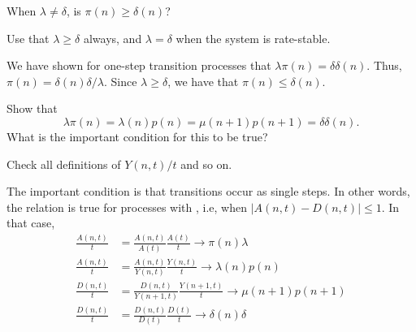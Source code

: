 \begin{exercise}
  When $\lambda\neq \delta$, is $\pi(n)\geq \delta(n)$?  
  \begin{hint}
Use that
    $\lambda \geq \delta$ always, and $\lambda=\delta$ when the system
    is rate-stable.
  \end{hint}
  \begin{solution}
    We have shown for one-step transition processes that
    $\lambda \pi(n) = \delta \delta(n)$. Thus,
    $\pi(n) = \delta(n)\delta /\lambda$. Since $\lambda\geq \delta$,
    we have that $\pi(n) \leq \delta(n)$.
  \end{solution}
\end{exercise}

\begin{exercise}
Show that 
\begin{equation*}
\lambda  \pi(n) = \lambda(n) p(n) = \mu(n+1) p(n+1) = \delta \delta(n).
\end{equation*}
What is the important condition for this to be true?
\begin{hint}
Check all definitions of $Y(n,t)/t$ and so on.
\end{hint}
\begin{solution}
  The important condition is that transitions occur as single
  steps. In other words, the relation is true for processes with
  , i.e, when $|A(n,t) - D(n,t)|\leq 1$.
  In  that case, 
\begin{align*}
  \frac{A(n,t)}{t} &=   \frac{A(n,t)}{A(t)} \frac{A(t)}{t} \to \pi(n) \lambda\\
  \frac{A(n,t)}{t} &=   \frac{A(n,t)}{Y(n,t)} \frac{Y(n,t)}{t} \to \lambda(n)p(n)\\
  \frac{D(n,t)}{t} &=   \frac{D(n,t)}{Y(n+1,t)} \frac{Y(n+1,t)}{t} \to \mu(n+1)p(n+1)\\
  \frac{D(n,t)}{t} &=   \frac{D(n,t)}{D(t)} \frac{D(t)}{t} \to \delta(n)\delta \\
\end{align*}
\end{solution}
\end{exercise}



